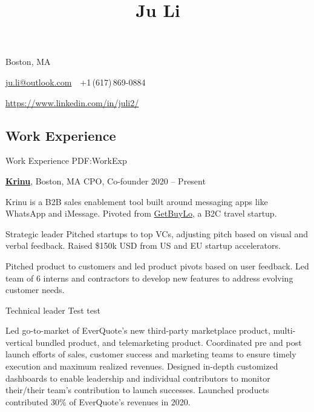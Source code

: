 \documentclass[letterpaper,10pt,oneside]{article}
\newcommand{\CVAuthor}{Ju Li}
\begin{document}

\title{\CVAuthor}

\begin{subtitle}
Boston, MA
\par
\href{mailto:ju.li@outlook.com}
{ju.li@outlook.com}
\,\SubBulletSymbol\,
+1\,(617)\,869-0884
\par 
\href{https://www.linkedin.com/in/juli2/}{https://www.linkedin.com/in/juli2/}
\end{subtitle}

\begin{body}


\section
{Work\newline
Experience}
{Work Experience}
{PDF:WorkExp}

\href{https://krinu.com/}
{\textbf{Krinu}},
Boston, MA
\GapNoBreak
CPO, Co-founder
\hfill
2020 -- Present
\begin{flushleft}

Krinu is a B2B sales enablement tool built around messaging apps like WhatsApp and iMessage. Pivoted from \href{https://getbuylo.com/}
{GetBuyLo}, a B2C travel startup.

\vspace{0.75em}
\BulletItem Strategic leader
\vspace{0.5em} \SubBulletItem Pitched startups to top VCs, adjusting pitch based on visual and verbal feedback. Raised \$150k USD from US and EU startup accelerators.

\vspace{0.5em} \SubBulletItem Pitched product to customers and led product pivots based on user feedback. Led team of 6 interns and contractors to develop new features to address evolving customer needs. 

\vspace{0.75em}
\BulletItem Technical leader
\vspace{0.5em} \SubBulletItem Test test

\vspace{0.5em} \SubBulletItem Led go-to-market of EverQuote's new third-party marketplace product, multi-vertical bundled product, and telemarketing product. Coordinated pre and post launch efforts of sales, customer success and marketing teams to ensure timely execution and maximum realized revenues. Designed in-depth customized dashboards to enable leadership and individual contributors to monitor their/their team's contribution to launch successes. Launched products contributed 30\% of EverQuote's revenues in 2020.


\end{flushleft}
\end{body}
\end{document}
